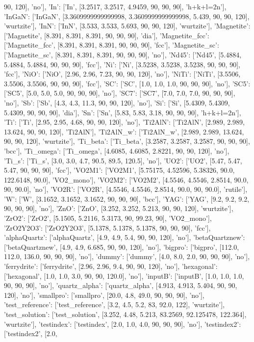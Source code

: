 \documentclass[letterpaper,10pt,english]{sphinxmanual}
\begin{document}
\begin{fulllineitems}
90, 120{]}, 'no'{]}, 'In': {[}'In', {[}3.2517, 3.2517, 4.9459, 90, 90, 90{]}, 'h+k+l=2n'{]}, 'InGaN': {[}'InGaN', {[}3.3609999999999998, 3.3609999999999998, 5.439, 90, 90, 120{]}, 'wurtzite'{]}, 'InN': {[}'InN', {[}3.533, 3.533, 5.693, 90, 90, 120{]}, 'wurtzite'{]}, 'Magnetite': {[}'Magnetite', {[}8.391, 8.391, 8.391, 90, 90, 90{]}, 'dia'{]}, 'Magnetite\_fcc': {[}'Magnetite\_fcc', {[}8.391, 8.391, 8.391, 90, 90, 90{]}, 'fcc'{]}, 'Magnetite\_sc': {[}'Magnetite\_sc', {[}8.391, 8.391, 8.391, 90, 90, 90{]}, 'no'{]}, 'Nd45': {[}'Nd45', {[}5.4884, 5.4884, 5.4884, 90, 90, 90{]}, 'fcc'{]}, 'Ni': {[}'Ni', {[}3.5238, 3.5238, 3.5238, 90, 90, 90{]}, 'fcc'{]}, 'NiO': {[}'NiO', {[}2.96, 2.96, 7.23, 90, 90, 120{]}, 'no'{]}, 'NiTi': {[}'NiTi', {[}3.5506, 3.5506, 3.5506, 90, 90, 90{]}, 'fcc'{]}, 'SC': {[}'SC', {[}1.0, 1.0, 1.0, 90, 90, 90{]}, 'no'{]}, 'SC5': {[}'SC5', {[}5.0, 5.0, 5.0, 90, 90, 90{]}, 'no'{]}, 'SC7': {[}'SC7', {[}7.0, 7.0, 7.0, 90, 90, 90{]}, 'no'{]}, 'Sb': {[}'Sb', {[}4.3, 4.3, 11.3, 90, 90, 120{]}, 'no'{]}, 'Si': {[}'Si', {[}5.4309, 5.4309, 5.4309, 90, 90, 90{]}, 'dia'{]}, 'Sn': {[}'Sn', {[}5.83, 5.83, 3.18, 90, 90, 90{]}, 'h+k+l=2n'{]}, 'Ti': {[}'Ti', {[}2.95, 2.95, 4.68, 90, 90, 120{]}, 'no'{]}, 'Ti2AlN': {[}'Ti2AlN', {[}2.989, 2.989, 13.624, 90, 90, 120{]}, 'Ti2AlN'{]}, 'Ti2AlN\_w': {[}'Ti2AlN\_w', {[}2.989, 2.989, 13.624, 90, 90, 120{]}, 'wurtzite'{]}, 'Ti\_beta': {[}'Ti\_beta', {[}3.2587, 3.2587, 3.2587, 90, 90, 90{]}, 'bcc'{]}, 'Ti\_omega': {[}'Ti\_omega', {[}4.6085, 4.6085, 2.8221, 90, 90, 120{]}, 'no'{]}, 'Ti\_s': {[}'Ti\_s', {[}3.0, 3.0, 4.7, 90.5, 89.5, 120.5{]}, 'no'{]}, 'UO2': {[}'UO2', {[}5.47, 5.47, 5.47, 90, 90, 90{]}, 'fcc'{]}, 'VO2M1': {[}'VO2M1', {[}5.75175, 4.52596, 5.38326, 90.0, 122.6148, 90.0{]}, 'VO2\_mono'{]}, 'VO2M2': {[}'VO2M2', {[}4.5546, 4.5546, 2.8514, 90.0, 90, 90.0{]}, 'no'{]}, 'VO2R': {[}'VO2R', {[}4.5546, 4.5546, 2.8514, 90.0, 90, 90.0{]}, 'rutile'{]}, 'W': {[}'W', {[}3.1652, 3.1652, 3.1652, 90, 90, 90{]}, 'bcc'{]}, 'YAG': {[}'YAG', {[}9.2, 9.2, 9.2, 90, 90, 90{]}, 'no'{]}, 'ZnO': {[}'ZnO', {[}3.252, 3.252, 5.213, 90, 90, 120{]}, 'wurtzite'{]}, 'ZrO2': {[}'ZrO2', {[}5.1505, 5.2116, 5.3173, 90, 99.23, 90{]}, 'VO2\_mono'{]}, 'ZrO2Y2O3': {[}'ZrO2Y2O3', {[}5.1378, 5.1378, 5.1378, 90, 90, 90{]}, 'fcc'{]}, 'alphaQuartz': {[}'alphaQuartz', {[}4.9, 4.9, 5.4, 90, 90, 120{]}, 'no'{]}, 'betaQuartznew': {[}'betaQuartznew', {[}4.9, 4.9, 6.685, 90, 90, 120{]}, 'no'{]}, 'bigpro': {[}'bigpro', {[}112.0, 112.0, 136.0, 90, 90, 90{]}, 'no'{]}, 'dummy': {[}'dummy', {[}4.0, 8.0, 2.0, 90, 90, 90{]}, 'no'{]}, 'ferrydrite': {[}'ferrydrite', {[}2.96, 2.96, 9.4, 90, 90, 120{]}, 'no'{]}, 'hexagonal': {[}'hexagonal', {[}1.0, 1.0, 3.0, 90, 90, 120.0{]}, 'no'{]}, 'inputB': {[}'inputB', {[}1.0, 1.0, 1.0, 90, 90, 90{]}, 'no'{]}, 'quartz\_alpha': {[}'quartz\_alpha', {[}4.913, 4.913, 5.404, 90, 90, 120{]}, 'no'{]}, 'smallpro': {[}'smallpro', {[}20.0, 4.8, 49.0, 90, 90, 90{]}, 'no'{]}, 'test\_reference': {[}'test\_reference', {[}3.2, 4.5, 5.2, 83, 92.0, 122{]}, 'wurtzite'{]}, 'test\_solution': {[}'test\_solution', {[}3.252, 4.48, 5.213, 83.2569, 92.125478, 122.364{]}, 'wurtzite'{]}, 'testindex': {[}'testindex', {[}2.0, 1.0, 4.0, 90, 90, 90{]}, 'no'{]}, 'testindex2': {[}'testindex2', {[}2.0, 
\end{fulllineitems}
\end{document}
